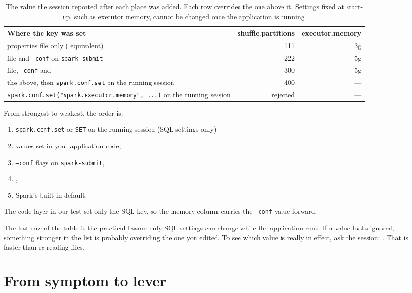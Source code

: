 \begin{table}[htbp]
\centering\footnotesize
\renewcommand{\arraystretch}{1.2}
\begin{tabular}{@{}P{6.2cm}rr@{}}
\toprule
\textbf{Where the key was set} & \textbf{shuffle.partitions} & \textbf{executor.memory} \\
\midrule
properties file only ( equivalent) & 111 & 3g \\
file and \texttt{--conf} on \texttt{spark-submit} & 222 & 5g \\
file, \texttt{--conf} and  & 300 & 5g \\
the above, then \texttt{spark.conf.set} on the running session & 400 & --- \\
\texttt{spark.conf.set("spark.executor.memory", ...)} on the running session & rejected & --- \\
\bottomrule
\end{tabular}
\caption{The value the session reported after each place was added. Each row
overrides the one above it. Settings fixed at start-up, such as executor memory,
cannot be changed once the application is running.}
\label{tab:tuning-precedence}
\end{table}

From strongest to weakest, the order is:
\begin{enumerate}[nosep]
\item \texttt{spark.conf.set} or \texttt{SET} on the running session (SQL settings only),
\item values set in your application code,
\item \texttt{--conf} flags on \texttt{spark-submit},
\item {},
\item Spark's built-in default.
\end{enumerate}

The code layer in our test set only the SQL key, so the memory column carries the
\texttt{--conf} value forward.

The last row of the table is the practical lesson: only SQL settings can change
while the application runs. If a value looks ignored, something stronger in the list
is probably overriding the one you edited. To see which value is really in effect,
ask the session: . That is faster than re-reading files.

\section{From symptom to lever}
\label{sec:tuning-levers}

